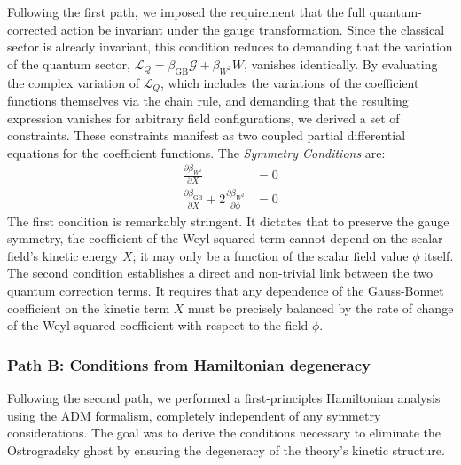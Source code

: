 \documentclass[twocolumn]{aastex631}
\begin{document}
Following the first path, we imposed the requirement that the full quantum-corrected action be invariant under the gauge transformation. Since the classical sector is already invariant, this condition reduces to demanding that the variation of the quantum sector, $\mathcal{L}_Q = \beta_{\text{GB}}\mathcal{G} + \beta_{W^2}W$, vanishes identically. By evaluating the complex variation of $\mathcal{L}_Q$, which includes the variations of the coefficient functions themselves via the chain rule, and demanding that the resulting expression vanishes for arbitrary field configurations, we derived a set of constraints. These constraints manifest as two coupled partial differential equations for the coefficient functions. The \textit{Symmetry Conditions} are:
\begin{align}
    \frac{\partial\beta_{W^2}}{\partial X} &= 0 \label{eq:sym_cond1} \\
    \frac{\partial\beta_{\text{GB}}}{\partial X} + 2 \frac{\partial\beta_{W^2}}{\partial\phi} &= 0 \label{eq:sym_cond2}
\end{align}
The first condition is remarkably stringent. It dictates that to preserve the gauge symmetry, the coefficient of the Weyl-squared term cannot depend on the scalar field's kinetic energy $X$; it may only be a function of the scalar field value $\phi$ itself. The second condition establishes a direct and non-trivial link between the two quantum correction terms. It requires that any dependence of the Gauss-Bonnet coefficient on the kinetic term $X$ must be precisely balanced by the rate of change of the Weyl-squared coefficient with respect to the field $\phi$.

\subsubsection{Path B: Conditions from Hamiltonian degeneracy}

Following the second path, we performed a first-principles Hamiltonian analysis using the ADM formalism, completely independent of any symmetry considerations. The goal was to derive the conditions necessary to eliminate the Ostrogradsky ghost by ensuring the degeneracy of the theory's kinetic structure.
\end{document}
